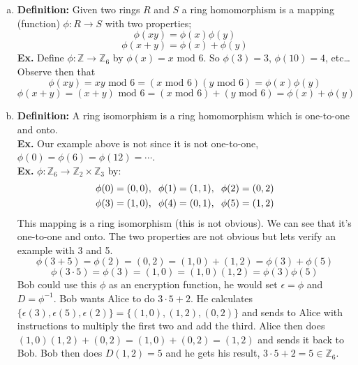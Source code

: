 \documentclass[class=article, crop=false]{standalone}
\def\integers{{\mathbb Z}}
\begin{document}
\begin{enumerate}[1.]
\begin{enumerate}[(a)]
		\item \textbf{Definition:} Given two rings $R$ and $S$ a ring homomorphism is a mapping (function)
		$\phi:R\rightarrow S$ with two properties; $$\phi(xy)=\phi(x)\phi(y)$$ 
		$$\phi(x+y)=\phi(x) + \phi(y)$$
		\textbf{Ex.} Define $\phi:\integers\rightarrow\integers_6$ by $\phi(x)=x\mbox{ mod }6$.
		So $\phi(3)=3$, $\phi(10)=4$, etc\dots Observe then that 
		$$\phi(xy)=xy\mbox{ mod }6 = (x\mbox{ mod }6)(y\mbox{ mod }6)=\phi(x)\phi(y)$$
		$$\phi(x+y)=(x+y)\mbox{ mod }6 = (x\mbox{ mod }6)+ (y\mbox{ mod }6) = \phi(x) + \phi(y)$$

		\item \textbf{Definition:} A ring isomorphism is a ring homomorphism which is one-to-one and onto.\\
		\textbf{Ex.} Our example above is not since it is not one-to-one, $\phi(0)=\phi(6)=\phi(12)=\cdots$. \\
		\textbf{Ex.} $\phi: \integers_6\rightarrow \integers_2\times\integers_3$ by:
		\begin{align*}
			\phi(0)=(0,0),\hspace{2mm} \phi(1)=(1,1),\hspace{2mm} \phi(2)=(0,2)\\
			\phi(3)=(1,0),\hspace{2mm} \phi(4)=(0,1),\hspace{2mm} \phi(5)=(1,2)
		\end{align*}
		This mapping is a ring isomorphism (this is not obvious). We can see that it's one-to-one and onto.
		The two properties are not obvious but lets verify an example with 3 and 5.
		$$\phi(3+5) = \phi(2) = (0, 2) = (1,0)+(1,2) = \phi(3)+\phi(5)$$
		$$\phi(3\cdot 5)= \phi(3) = (1, 0) = (1,0)(1,2) =\phi(3)\phi(5)$$
		Bob could use this $\phi$ as an encryption function, he would set $\epsilon =\phi$ and $D=\phi^{-1}$.
		Bob wants Alice to do $3\cdot 5 +2$. He calculates $\{\epsilon(3), \epsilon(5),\epsilon(2)\} = \{(1,0), (1,2), (0,2)\}$
		and sends to Alice with instructions to multiply the first two and add the third.
		Alice then does $(1,0)(1,2) + (0,2) = (1,0) + (0,2) = (1,2)$ and sends it back to Bob.
		Bob then does $D(1,2)=5$ and he gets his result, $3\cdot 5+2=5\in\integers_6$.
	\end{enumerate}


\end{enumerate}
\end{document}
